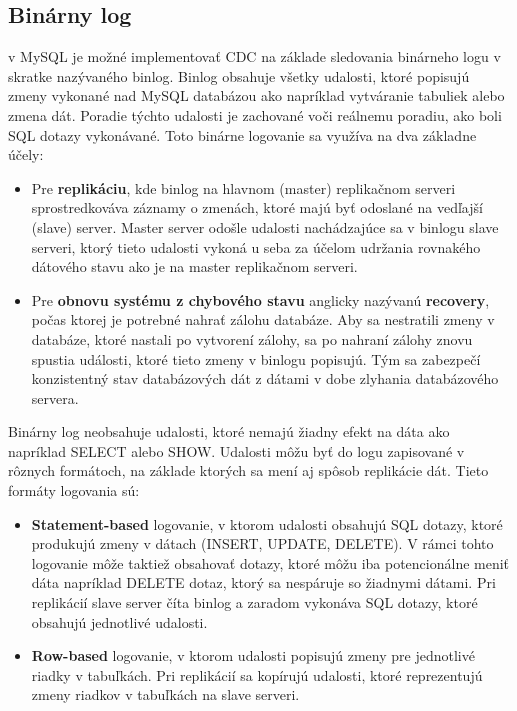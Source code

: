 \subsection{Binárny log} \label{mysql:binlog}
v MySQL je možné implementovať CDC na základe sledovania binárneho logu v skratke nazývaného binlog\cite{mysql:reference_manual}. Binlog obsahuje všetky udalosti, ktoré popisujú zmeny vykonané nad MySQL databázou ako napríklad vytváranie tabuliek alebo zmena dát. Poradie týchto udalosti je zachované voči reálnemu poradiu, ako boli SQL dotazy vykonávané. Toto binárne logovanie sa využíva na dva základne účely:
\begin{itemize}
\item Pre \textbf{replikáciu}, kde binlog na hlavnom (master) replikačnom serveri sprostredkováva záznamy o zmenách, ktoré majú byť odoslané na vedľajší (slave) server. Master server odošle udalosti nachádzajúce sa v binlogu slave serveri, ktorý tieto udalosti vykoná u seba za účelom udržania rovnakého dátového stavu ako je na master replikačnom serveri.
\item Pre \textbf{obnovu systému z chybového stavu} anglicky nazývanú \textbf{recovery}, počas ktorej je potrebné nahrať zálohu databáze. Aby sa nestratili zmeny v databáze, ktoré nastali po vytvorení zálohy, sa po nahraní zálohy znovu spustia události, ktoré tieto zmeny v binlogu popisujú. Tým sa zabezpečí konzistentný stav databázových dát z dátami v dobe zlyhania databázového servera.
\end{itemize}

Binárny log neobsahuje udalosti, ktoré nemajú žiadny efekt na dáta ako napríklad  SELECT alebo SHOW. Udalosti môžu byť do logu zapisované v rôznych formátoch, na základe ktorých sa mení aj spôsob replikácie dát. Tieto formáty logovania sú:
\begin{itemize}
\item \textbf{Statement-based} logovanie, v ktorom udalosti obsahujú SQL dotazy, ktoré produkujú zmeny v dátach (INSERT, UPDATE, DELETE). V rámci tohto logovanie môže taktiež obsahovať dotazy, ktoré môžu iba potencionálne meniť dáta napríklad DELETE dotaz, ktorý sa nespáruje so žiadnymi dátami. Pri replikácií slave server číta binlog a zaradom vykonáva SQL dotazy, ktoré obsahujú jednotlivé udalosti.
\item \textbf{Row-based} logovanie, v ktorom udalosti popisujú zmeny pre jednotlivé riadky v tabuľkách. Pri replikácií sa kopírujú udalosti, ktoré reprezentujú zmeny riadkov v tabuľkách na slave serveri. 
\end{itemize}

